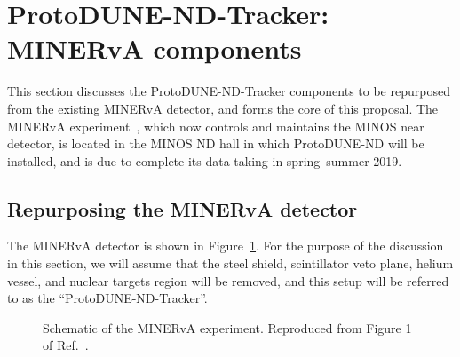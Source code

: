 \section{ProtoDUNE-ND-Tracker: MINERvA components}
\label{sec:MINERvA}

This section discusses the ProtoDUNE-ND-Tracker components to be repurposed from the existing MINERvA detector, and forms the core of this proposal. The MINERvA experiment~\cite{minerva-nim}, which now controls and maintains the MINOS near detector, is located in the MINOS ND hall in which ProtoDUNE-ND will be installed, and is due to complete its data-taking in spring--summer 2019.

\subsection{Repurposing the MINERvA detector}
\label{sec:minerva}
The MINERvA detector is shown in Figure~\ref{fig:minerva_detector}. For the purpose of the discussion in this section, we will assume that the steel shield, scintillator veto plane, helium vessel, and nuclear targets region will be removed, and this setup will be referred to as the ``ProtoDUNE-ND-Tracker''.

\begin{figure}[htb]
  \centering
  \caption{Schematic of the MINERvA experiment. Reproduced from Figure 1 of Ref.~\cite{minerva-nim}.}
  \label{fig:minerva_detector}
\end{figure}

